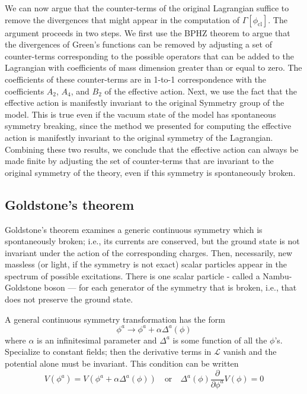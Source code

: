 We can now argue that the counter-terms of the original Lagrangian suffice to remove the divergences that might appear in the computation of $\Gamma[\phi_{\mathrm{cl}}]$. The argument proceeds in two steps. We first use the BPHZ theorem to argue that the divergences of Green's functions can be removed by adjusting a set of counter-terms corresponding to the possible operators that can be added to the Lagrangian with coefficients of mass dimension greater than or equal to zero. The coefficients of these counter-terms are in 1-to-1 correspondence with the coefficients $A_2$, $A_4$, and $B_2$ of the effective action. Next, we use the fact that the effective action is manifestly invariant to the original Symmetry group of the model. This is true even if the vacuum state of the model has spontaneous symmetry breaking, since the method we presented for computing the effective action is manifestly invariant to the original symmetry of the Lagrangian. Combining these two results, we conclude that the effective action can always be made finite by adjusting the set of counter-terms that are invariant to the original symmetry of the theory, even if this symmetry is spontaneously broken.

\subsection{Goldstone's theorem}
\begin{newthem}
Goldstone's theorem examines a generic continuous symmetry which is spontaneously broken; i.e., its currents are conserved, but the ground state is not invariant under the action of the corresponding charges. Then, necessarily, new massless (or light, if the symmetry is not exact) scalar particles appear in the spectrum of possible excitations. There is one scalar particle - called a Nambu-Goldstone boson — for each generator of the symmetry that is broken, i.e., that does not preserve the ground state.
\end{newthem}

A general continuous symmetry transformation has the form
\[\phi^a \to \phi^a + \alpha \Delta^a (\phi)\]
where $\alpha$ is an infinitesimal parameter and $\Delta^a$ is some function of all the $\phi$'s. Specialize to constant fields; then the derivative terms in $\mathcal{L}$ vanish and the potential alone must be invariant. This condition can be written
\[V(\phi^a) = V(\phi^a + \alpha \Delta^a (\phi)) \quad \mbox{or} \quad \Delta^a(\phi) \frac{\partial}{\partial \phi^a} V(\phi) = 0\]\\

